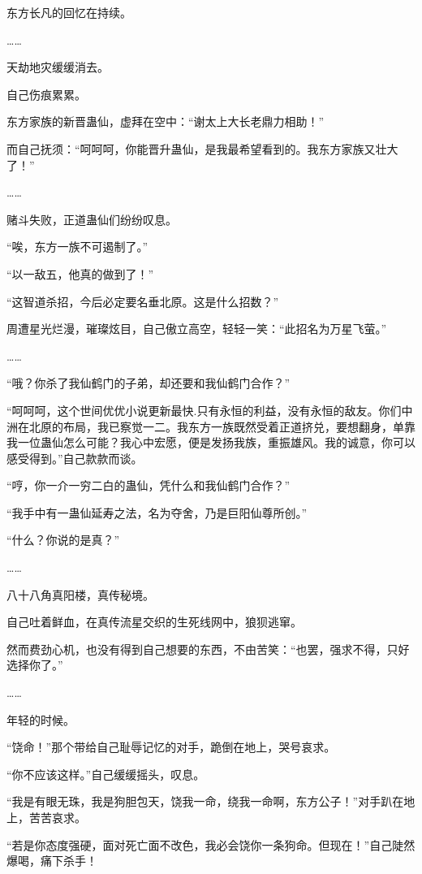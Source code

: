 
\begin{this_body}

东方长凡的回忆在持续。

……

天劫地灾缓缓消去。

自己伤痕累累。

东方家族的新晋蛊仙，虚拜在空中：“谢太上大长老鼎力相助！”

而自己抚须：“呵呵呵，你能晋升蛊仙，是我最希望看到的。我东方家族又壮大了！”

……

赌斗失败，正道蛊仙们纷纷叹息。

“唉，东方一族不可遏制了。”

“以一敌五，他真的做到了！”

“这智道杀招，今后必定要名垂北原。这是什么招数？”

周遭星光烂漫，璀璨炫目，自己傲立高空，轻轻一笑：“此招名为万星飞萤。”

……

“哦？你杀了我仙鹤门的子弟，却还要和我仙鹤门合作？”

“呵呵呵，这个世间优优小说更新最快.只有永恒的利益，没有永恒的敌友。你们中洲在北原的布局，我已察觉一二。我东方一族既然受着正道挤兑，要想翻身，单靠我一位蛊仙怎么可能？我心中宏愿，便是发扬我族，重振雄风。我的诚意，你可以感受得到。”自己款款而谈。

“哼，你一介一穷二白的蛊仙，凭什么和我仙鹤门合作？”

“我手中有一蛊仙延寿之法，名为夺舍，乃是巨阳仙尊所创。”

“什么？你说的是真？”

……

八十八角真阳楼，真传秘境。

自己吐着鲜血，在真传流星交织的生死线网中，狼狈逃窜。

然而费劲心机，也没有得到自己想要的东西，不由苦笑：“也罢，强求不得，只好选择你了。”

……

年轻的时候。

“饶命！”那个带给自己耻辱记忆的对手，跪倒在地上，哭号哀求。

“你不应该这样。”自己缓缓摇头，叹息。

“我是有眼无珠，我是狗胆包天，饶我一命，绕我一命啊，东方公子！”对手趴在地上，苦苦哀求。

“若是你态度强硬，面对死亡面不改色，我必会饶你一条狗命。但现在！”自己陡然爆喝，痛下杀手！


\end{this_body}
